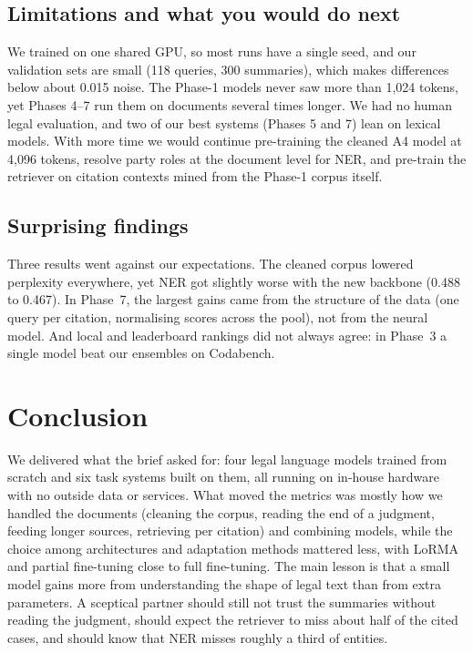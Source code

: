\documentclass[11pt, oneside]{article}
\begin{document}
\subsection{Limitations and what you would do next}
We trained on one shared GPU, so most runs have a single seed, and our validation sets are small (118 queries,
300 summaries), which makes differences below about 0.015 noise.  The Phase-1 models never saw more than 1,024
tokens, yet Phases 4--7 run them on documents several times longer.  We had no human legal evaluation, and two
of our best systems (Phases 5 and 7) lean on lexical models.  With more time we would continue pre-training the
cleaned A4 model at 4,096 tokens, resolve party roles at the document level for NER, and pre-train the retriever
on citation contexts mined from the Phase-1 corpus itself.

\subsection{Surprising findings}
Three results went against our expectations.  The cleaned corpus lowered perplexity everywhere, yet NER got
slightly worse with the new backbone (0.488 to 0.467).  In Phase~7, the largest gains came from the structure of
the data (one query per citation, normalising scores across the pool), not from the neural model.  And local
and leaderboard rankings did not always agree: in Phase~3 a single model beat our ensembles on Codabench.

\section{Conclusion}
We delivered what the brief asked for: four legal language models trained from scratch and six task systems
built on them, all running on in-house hardware with no outside data or services.  What moved the metrics was
mostly how we handled the documents (cleaning the corpus, reading the end of a judgment, feeding longer
sources, retrieving per citation) and combining models, while the choice among architectures and adaptation
methods mattered less, with LoRMA and partial fine-tuning close to full fine-tuning.  The main lesson is that a
small model gains more from understanding the shape of legal text than from extra parameters.  A sceptical
partner should still not trust the summaries without reading the judgment, should expect the retriever to miss
about half of the cited cases, and should know that NER misses roughly a third of entities.
\end{document}
